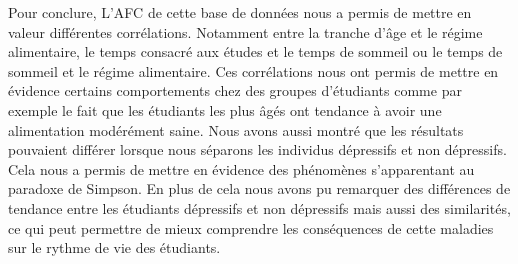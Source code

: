 Pour conclure, L'AFC de cette base de données nous a permis de mettre en valeur différentes corrélations.
Notamment entre la tranche d'âge et le régime alimentaire, le temps consacré aux études et le temps de sommeil ou le temps de sommeil et le régime alimentaire.
Ces corrélations nous ont permis de mettre en évidence certains comportements chez des groupes d'étudiants comme par exemple le fait que les étudiants les plus âgés ont tendance à avoir une alimentation modérément saine. 
Nous avons aussi montré que les résultats pouvaient différer lorsque nous séparons les individus dépressifs et non dépressifs.
Cela nous a permis de mettre en évidence des phénomènes s'apparentant au paradoxe de Simpson.
En plus de cela nous avons pu remarquer des différences de tendance entre les étudiants dépressifs et non dépressifs mais aussi des similarités, ce qui peut permettre de mieux comprendre les conséquences de cette maladies sur le rythme de vie des étudiants.

